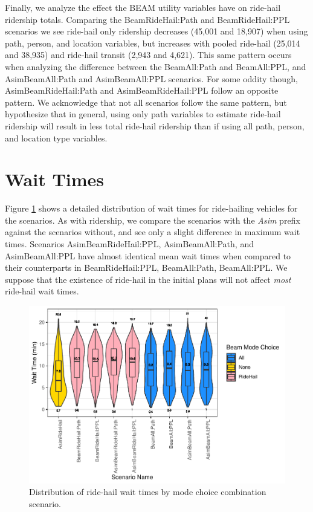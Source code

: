 \documentclass[fancy, masters]{byuthesis}
\begin{document}
Finally, we analyze the effect the BEAM utility variables have on ride-hail ridership totals. Comparing the BeamRideHail:Path and BeamRideHail:PPL scenarios we see ride-hail only ridership decreases (45,001 and 18,907) when using path, person, and location variables, but increases with pooled ride-hail (25,014 and 38,935) and ride-hail transit (2,943 and 4,621). This same pattern occurs when analyzing the difference between the BeamAll:Path and BeamAll:PPL, and AsimBeamAll:Path and AsimBeamAll:PPL scenarios. For some oddity though, AsimBeamRideHail:Path and AsimBeamRideHail:PPL follow an opposite pattern. We acknowledge that not all scenarios follow the same pattern, but hypothesize that in general, using only path variables to estimate ride-hail ridership will result in less total ride-hail ridership than if using all path, person, and location type variables.

\hypertarget{res-waits}{%
\section{Wait Times}\label{res-waits}}

Figure \ref{fig:waits} shows a detailed distribution of wait times for ride-hailing vehicles for the scenarios. As with ridership, we compare the scenarios with the \emph{Asim} prefix against the scenarios without, and see only a slight difference in maximum wait times. Scenarios AsimBeamRideHail:PPL, AsimBeamAll:Path, and AsimBeamAll:PPL have almost identical mean wait times when compared to their counterparts in BeamRideHail:PPL, BeamAll:Path, BeamAll:PPL. We suppose that the existence of ride-hail in the initial plans will not affect \emph{most} ride-hail wait times.

\begin{figure}

{\centering \includegraphics{thesis_files/figure-latex/waits-1} 

}

\caption[Distribution of ride-hail wait times.]{Distribution of ride-hail wait times by mode choice combination scenario.}\label{fig:waits}
\end{figure}
\end{document}
